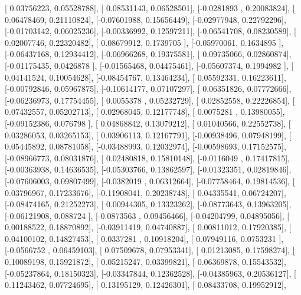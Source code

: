 \documentclass{article}
\begin{document}
       [ 0.03756223,  0.05528788],
       [ 0.08531143,  0.06528501],
       [-0.0281893 ,  0.20083824],
       [ 0.06478469,  0.21110824],
       [-0.07601988,  0.15656449],
       [-0.02977948,  0.22792296],
       [-0.01703142,  0.06025236],
       [-0.00336992,  0.12597211],
       [-0.06541708,  0.08230589],
       [ 0.02007746,  0.22320482],
       [ 0.08679912,  0.1739705 ],
       [-0.05970061,  0.1634895 ],
       [-0.06437168,  0.12934412],
       [-0.06966268,  0.19375581],
       [ 0.09735066,  0.02860874],
       [-0.01175435,  0.0426878 ],
       [-0.01565468,  0.04475461],
       [-0.05607374,  0.1994982 ],
       [ 0.04141524,  0.10054628],
       [-0.08454767,  0.13464234],
       [ 0.05592331,  0.16223611],
       [-0.00792846,  0.05967875],
       [-0.10614177,  0.07107297],
       [ 0.06351826,  0.07772666],
       [-0.06236973,  0.17754455],
       [ 0.0055378 ,  0.05232729],
       [ 0.02852558,  0.22226854],
       [ 0.07432557,  0.05202713],
       [ 0.02968045,  0.12177748],
       [ 0.0075281 ,  0.13980055],
       [-0.09152386,  0.076798  ],
       [ 0.04868842,  0.13079212],
       [ 0.01040566,  0.22552738],
       [ 0.03286053,  0.03265153],
       [ 0.03906113,  0.12167791],
       [-0.00938496,  0.07948199],
       [ 0.05445892,  0.08781058],
       [-0.03488993,  0.12032974],
       [-0.00598693,  0.17152575],
       [-0.08966773,  0.08031876],
       [ 0.02480818,  0.15810148],
       [-0.0116049 ,  0.17417815],
       [-0.00363938,  0.14636535],
       [-0.05303766,  0.13862597],
       [-0.01323351,  0.02819846],
       [-0.07606003,  0.09807499],
       [-0.0382019 ,  0.06312664],
       [-0.07758464,  0.19814536],
       [ 0.03796967,  0.17233676],
       [-0.11908041,  0.20238748],
       [ 0.04335541,  0.06724207],
       [-0.08474165,  0.21252273],
       [ 0.00944305,  0.13323262],
       [-0.08773643,  0.13963205],
       [-0.06121908,  0.088724  ],
       [-0.0873563 ,  0.09456466],
       [-0.04204799,  0.04895056],
       [ 0.00188522,  0.18870892],
       [-0.03911419,  0.04740887],
       [ 0.00811012,  0.17920385],
       [ 0.04100102,  0.14827453],
       [ 0.0337281 ,  0.10918204],
       [ 0.07949116,  0.0753231 ],
       [-0.0566752 ,  0.06459103],
       [ 0.07509678,  0.07953341],
       [ 0.01213085,  0.17598274],
       [ 0.10089198,  0.15921872],
       [ 0.05215247,  0.03399821],
       [ 0.06369878,  0.15543532],
       [-0.05237864,  0.18150323],
       [-0.03347844,  0.12362528],
       [-0.04385963,  0.20536127],
       [ 0.11243462,  0.07724695],
       [ 0.13195129,  0.12426301],
       [ 0.08433708,  0.19952912],
\end{document}
